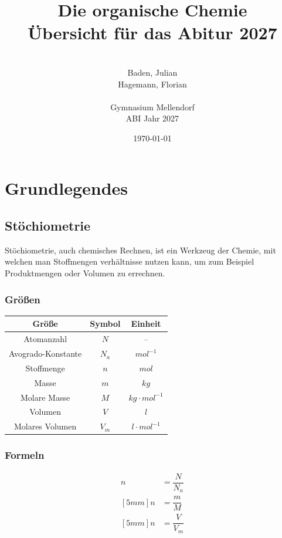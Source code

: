 \documentclass[a4paper]{report}
\title{\Huge{Die organische Chemie}\\\large{Übersicht für das Abitur 2027}}
\date{\today}
\author{\quad\\Baden, Julian\\Hagemann, Florian\\\\Gymnasium Mellendorf\\ABI Jahr 2027}
\begin{document}
\maketitle
\thispagestyle{empty}
\newpage
\tableofcontents \thispagestyle{empty}
\newpage
{}




\chapter{Grundlegendes}
\section{Stöchiometrie}
Stöchiometrie, auch chemisches Rechnen, ist ein Werkzeug der Chemie, mit welchen man Stoffmengen verhältnisse
nutzen kann, um zum Beispiel Produktmengen oder Volumen zu errechnen.
\subsection{Größen}
\begin{center}
\begin{tabular}{|c|c|c|}
    \hline
    Größe       &Symbol     &Einheit \\\hline
    Atomanzahl  &$N$        &-- \\ 
    Avogrado-Konstante &$N_a$ &$mol^{-1}$ \\
    Stoffmenge &$n$ &$mol$ \\
    Masse &$m$ &$kg$ \\
    Molare Masse &$M$ &$kg \cdot mol^{-1}$ \\
    Volumen &$V$ &$l$ \\
    Molares Volumen &$V_m$ &$l \cdot mol^{-1}$\\ \hline
\end{tabular}
\end{center}

\subsection{Formeln}
\Large
\begin{eqnarray*}
    n &= \dfrac{N}{N_a} \\ [5mm]
    n &= \dfrac{m}{M} \\ [5mm]
    n &= \dfrac{V}{V_m}
\end{eqnarray*}
\normalsize
\end{document}
